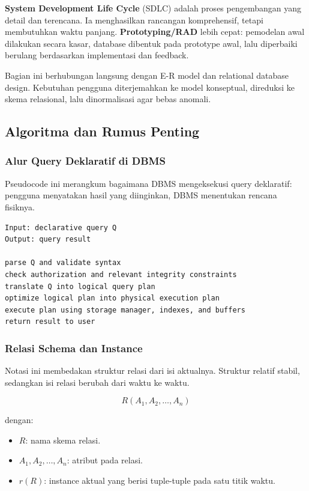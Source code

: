 \textbf{System Development Life Cycle} (SDLC) adalah proses pengembangan yang detail dan terencana. Ia menghasilkan rancangan komprehensif, tetapi membutuhkan waktu panjang. \textbf{Prototyping/RAD} lebih cepat: pemodelan awal dilakukan secara kasar, database dibentuk pada prototype awal, lalu diperbaiki berulang berdasarkan implementasi dan feedback.

Bagian ini berhubungan langsung dengan E-R model dan relational database design. Kebutuhan pengguna diterjemahkan ke model konseptual, direduksi ke skema relasional, lalu dinormalisasi agar bebas anomali.

\subsection{Algoritma dan Rumus Penting}

\subsubsection{Alur Query Deklaratif di DBMS}

\begin{jawab}
Pseudocode ini merangkum bagaimana DBMS mengeksekusi query deklaratif: pengguna menyatakan hasil yang diinginkan, DBMS menentukan rencana fisiknya.
\end{jawab}

\begin{lstlisting}[caption={Pseudocode alur pemrosesan query}, label={lst:query-processing-intro}]
Input: declarative query Q
Output: query result

parse Q and validate syntax
check authorization and relevant integrity constraints
translate Q into logical query plan
optimize logical plan into physical execution plan
execute plan using storage manager, indexes, and buffers
return result to user
\end{lstlisting}

\subsubsection{Relasi Schema dan Instance}

\begin{jawab}
Notasi ini membedakan struktur relasi dari isi aktualnya. Struktur relatif stabil, sedangkan isi relasi berubah dari waktu ke waktu.
\end{jawab}

\begin{equation}
    R(A_1,A_2,\ldots,A_n)
    \label{eq:intro-relation-schema}
\end{equation}

dengan:
\begin{itemize}
    \item \(R\): nama skema relasi.
    \item \(A_1,A_2,\ldots,A_n\): atribut pada relasi.
    \item \(r(R)\): instance aktual yang berisi tuple-tuple pada satu titik waktu.
\end{itemize}
